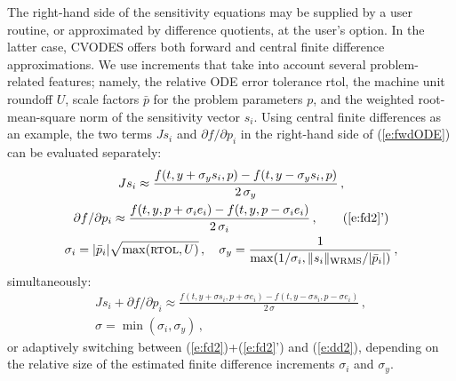 The right-hand side of the sensitivity equations may be supplied by a 
user routine, or approximated by difference quotients, at the user's option.
In the latter case, CVODES offers both forward and central finite 
difference approximations. 
%
We use increments that take into account several problem-related features;
namely, the relative ODE error tolerance {\sc rtol}, 
the machine unit roundoff $U$,
scale factors $\bar p$ for the problem parameters $p$, 
and the weighted root-mean-square norm of the sensitivity vector $s_i$.
%
Using central finite differences as an example, the two terms $J s_i$ 
and ${\partial f}/{\partial p_i}$ in the right-hand side of (\ref{e:fwdODE}) 
can be evaluated separately:
\begin{gather}
  J s_i \approx \frac{f(t, y+\sigma_y s_i, p)-
    f(t, y-\sigma_y s_i, p)}{2\,\sigma_y} \, , \label{e:fd2} \\
  {\partial f}/{\partial p_i} \approx \frac{f(t,y,p + \sigma_i e_i)-
    f(t,y,p - \sigma_i e_i)}{2\,\sigma_i} \, , \tag{\ref{e:fd2}'} \\
  \sigma_i = |{\bar p}_i| \sqrt{\max(\mbox{\sc rtol}, U)} \, , \quad
  \sigma_y = \frac{1}{\max(1/\sigma_i, \|s_i\|_{\mbox{\scriptsize WRMS}} / |{\bar p}_i|)} \, , \nonumber
\end{gather}
simultaneously:
\begin{gather}
  J s_i + {\partial f}/{\partial p_i} \approx
  \frac{f(t, y+\sigma s_i, p + \sigma e_i) -
    f(t, y-\sigma s_i, p - \sigma e_i)}{2\,\sigma} \, , \label{e:dd2} \\
  \sigma = \min(\sigma_i, \sigma_y) \, , \nonumber
\end{gather}
or adaptively switching between (\ref{e:fd2})+(\ref{e:fd2}') and (\ref{e:dd2}), 
depending on the relative size of the estimated finite difference 
increments $\sigma_i$ and $\sigma_y$.


